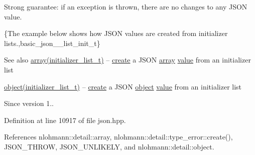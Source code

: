 Strong guarantee\+: if an exception is thrown, there are no changes to any J\+S\+ON value.

\{The example below shows how J\+S\+ON values are created from initializer lists.,basic\+\_\+json\+\_\+\+\_\+list\+\_\+init\+\_\+t\}

\begin{DoxySeeAlso}{See also}
\hyperlink{classnlohmann_1_1basic__json_aa80485befaffcadaa39965494e0b4d2e}{array(initializer\+\_\+list\+\_\+t)} -- \hyperlink{classnlohmann_1_1basic__json_a81100399cf3e2be457937be7db3f5729}{create} a J\+S\+ON \hyperlink{classnlohmann_1_1basic__json_aa80485befaffcadaa39965494e0b4d2e}{array} \hyperlink{classnlohmann_1_1basic__json_adcf8ca5079f5db993820bf50036bf45d}{value} from an initializer list 

\hyperlink{classnlohmann_1_1basic__json_aa13f7c0615867542ce80337cbcf13ada}{object(initializer\+\_\+list\+\_\+t)} -- \hyperlink{classnlohmann_1_1basic__json_a81100399cf3e2be457937be7db3f5729}{create} a J\+S\+ON \hyperlink{classnlohmann_1_1basic__json_aa13f7c0615867542ce80337cbcf13ada}{object} \hyperlink{classnlohmann_1_1basic__json_adcf8ca5079f5db993820bf50036bf45d}{value} from an initializer list
\end{DoxySeeAlso}
\begin{DoxySince}{Since}
version 1.. 
\end{DoxySince}


Definition at line 10917 of file json.\+hpp.



References nlohmann\+::detail\+::array, nlohmann\+::detail\+::type\+\_\+error\+::create(), J\+S\+O\+N\+\_\+\+T\+H\+R\+OW, J\+S\+O\+N\+\_\+\+U\+N\+L\+I\+K\+E\+LY, and nlohmann\+::detail\+::object.


